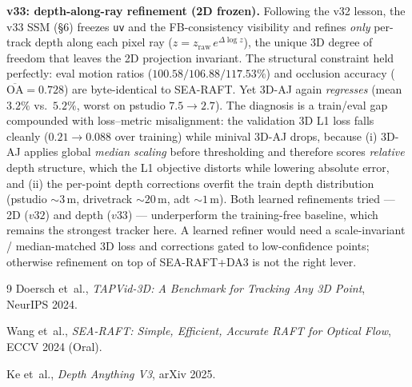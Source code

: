 \documentclass[11pt,a4paper]{article}
\begin{document}
\medskip
\noindent \textbf{v33: depth-along-ray refinement (2D frozen).} Following the
v32 lesson, the v33 SSM (\S6) freezes \texttt{uv} and the FB-consistency
visibility and refines \emph{only} per-track depth along each pixel ray
($z = z_{\text{raw}}\,e^{\Delta\log z}$), the unique 3D degree of freedom that
leaves the 2D projection invariant. The structural constraint held perfectly:
eval motion ratios ($100.58/106.88/117.53\%$) and occlusion accuracy
($\overline{\text{OA}}=0.728$) are byte-identical to SEA-RAFT. Yet 3D-AJ again
\emph{regresses} (mean $3.2\%$ vs.\ $5.2\%$, worst on pstudio $7.5\!\to\!2.7$).
The diagnosis is a train/eval gap compounded with loss–metric misalignment: the
validation 3D L1 loss falls cleanly ($0.21\!\to\!0.088$ over training) while
minival 3D-AJ drops, because (i) 3D-AJ applies global \emph{median scaling}
before thresholding and therefore scores \emph{relative} depth structure, which
the L1 objective distorts while lowering absolute error, and (ii) the per-point
depth corrections overfit the train depth distribution (pstudio ${\sim}3$\,m,
drivetrack ${\sim}20$\,m, adt ${\sim}1$\,m). Both learned refinements tried ---
2D ($v32$) and depth ($v33$) --- underperform the training-free baseline, which
remains the strongest tracker here. A learned refiner would need a
scale-invariant / median-matched 3D loss and corrections gated to
low-confidence points; otherwise refinement on top of SEA-RAFT+DA3 is not the
right lever.

\begin{thebibliography}{9}
  Doersch et~al.,
  \textit{TAPVid-3D: A Benchmark for Tracking Any 3D Point},
  NeurIPS 2024.

  Wang et~al.,
  \textit{SEA-RAFT: Simple, Efficient, Accurate RAFT for Optical Flow},
  ECCV 2024 (Oral).

  Ke et~al.,
  \textit{Depth Anything V3},
  arXiv 2025.
\end{thebibliography}
\end{document}
